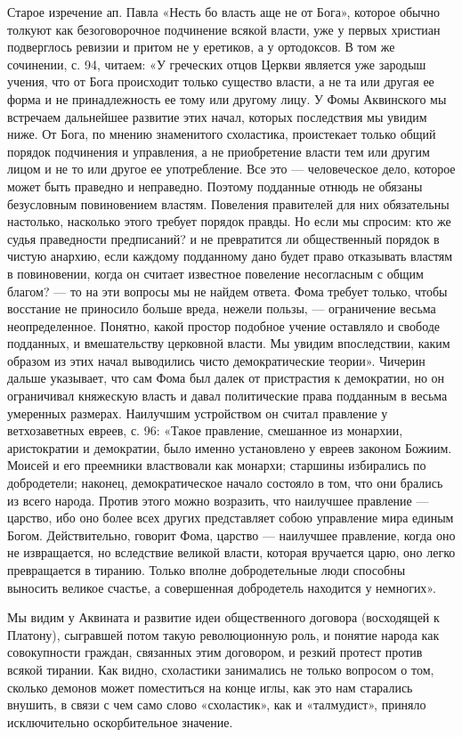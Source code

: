 Старое изречение ап. Павла «Несть бо власть аще не от Бога», которое обычно
толкуют как безоговорочное подчинение всякой власти, уже у первых христиан
подверглось ревизии и притом не у еретиков, а у ортодоксов. В том же сочинении,
с. 94, читаем: «У греческих отцов Церкви является уже зародыш учения, что от
Бога происходит только существо власти, а не та или другая ее форма и не
принадлежность ее тому или другому лицу. У Фомы Аквинского мы встречаем
дальнейшее развитие этих начал, которых последствия мы увидим ниже. От Бога, по
мнению знаменитого схоластика, проистекает только общий порядок подчинения и
управления, а не приобретение власти тем или другим лицом и не то или другое ее
употребление. Все это --- человеческое дело, которое может быть праведно и
неправедно. Поэтому подданные отнюдь не обязаны безусловным повиновением
властям. Повеления правителей для них обязательны настолько, насколько этого
требует порядок правды. Но если мы спросим: кто же судья праведности
предписаний? и не превратится ли общественный порядок в чистую анархию, если
каждому подданному дано будет право отказывать властям в повиновении, когда он
считает известное повеление несогласным с общим благом? --- то на эти вопросы мы
не найдем ответа. Фома требует только, чтобы восстание не приносило больше
вреда, нежели пользы, --- ограничение весьма неопределенное. Понятно, какой
простор подобное учение оставляло и свободе подданных, и вмешательству
церковной власти. Мы увидим впоследствии, каким образом из этих начал
выводились чисто демократические теории». Чичерин дальше указывает, что сам
Фома был далек от пристрастия к демократии, но он ограничивал княжескую власть
и давал политические права подданным в весьма умеренных размерах. Наилучшим
устройством он считал правление у ветхозаветных евреев, с. 96: «Такое
правление, смешанное из монархии, аристократии и демократии, было именно
установлено у евреев законом Божиим. Моисей и его преемники властвовали как
монархи; старшины избирались по добродетели; наконец, демократическое начало
состояло в том, что они брались из всего народа. Против этого можно возразить,
что наилучшее правление --- царство, ибо оно более всех других представляет собою
управление мира единым Богом. Действительно, говорит Фома, царство --- наилучшее
правление, когда оно не извращается, но вследствие великой власти, которая
вручается царю, оно легко превращается в тиранию.
Только вполне добродетельные люди способны выносить великое счастье, а
совершенная добродетель находится у немногих».

Мы видим у Аквината и развитие идеи общественного договора (восходящей к
Платону), сыгравшей потом такую революционную роль, и понятие народа как
совокупности граждан, связанных этим договором, и резкий протест против всякой
тирании. Как видно, схоластики занимались не только вопросом о том, сколько
демонов может поместиться на конце иглы, как это нам старались внушить, в связи
с чем само слово «схоластик», как и «талмудист», приняло исключительно
оскорбительное значение.

